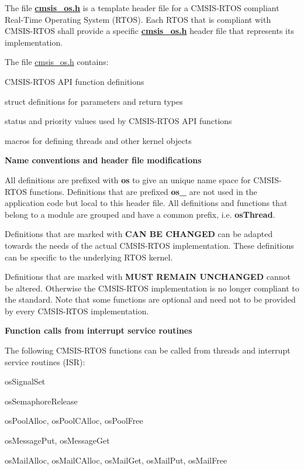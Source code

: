 The file {\bfseries{\mbox{\hyperlink{cmsis__os_8h_source}{cmsis\+\_\+os.\+h}}}} is a template header file for a C\+M\+S\+I\+S-\/\+R\+T\+OS compliant Real-\/\+Time Operating System (R\+T\+OS). Each R\+T\+OS that is compliant with C\+M\+S\+I\+S-\/\+R\+T\+OS shall provide a specific {\bfseries{\mbox{\hyperlink{cmsis__os_8h_source}{cmsis\+\_\+os.\+h}}}} header file that represents its implementation.

The file \mbox{\hyperlink{cmsis__os_8h_source}{cmsis\+\_\+os.\+h}} contains\+:
\begin{DoxyItemize}
\item C\+M\+S\+I\+S-\/\+R\+T\+OS A\+PI function definitions
\item struct definitions for parameters and return types
\item status and priority values used by C\+M\+S\+I\+S-\/\+R\+T\+OS A\+PI functions
\item macros for defining threads and other kernel objects
\end{DoxyItemize}

{\bfseries{Name conventions and header file modifications}}

All definitions are prefixed with {\bfseries{os}} to give an unique name space for C\+M\+S\+I\+S-\/\+R\+T\+OS functions. Definitions that are prefixed {\bfseries{os\+\_\+}} are not used in the application code but local to this header file. All definitions and functions that belong to a module are grouped and have a common prefix, i.\+e. {\bfseries{os\+Thread}}.

Definitions that are marked with {\bfseries{C\+AN BE C\+H\+A\+N\+G\+ED}} can be adapted towards the needs of the actual C\+M\+S\+I\+S-\/\+R\+T\+OS implementation. These definitions can be specific to the underlying R\+T\+OS kernel.

Definitions that are marked with {\bfseries{M\+U\+ST R\+E\+M\+A\+IN U\+N\+C\+H\+A\+N\+G\+ED}} cannot be altered. Otherwise the C\+M\+S\+I\+S-\/\+R\+T\+OS implementation is no longer compliant to the standard. Note that some functions are optional and need not to be provided by every C\+M\+S\+I\+S-\/\+R\+T\+OS implementation.

{\bfseries{Function calls from interrupt service routines}}

The following C\+M\+S\+I\+S-\/\+R\+T\+OS functions can be called from threads and interrupt service routines (I\+SR)\+:
\begin{DoxyItemize}
\item os\+Signal\+Set
\item os\+Semaphore\+Release
\item os\+Pool\+Alloc, os\+Pool\+C\+Alloc, os\+Pool\+Free
\item os\+Message\+Put, os\+Message\+Get
\item os\+Mail\+Alloc, os\+Mail\+C\+Alloc, os\+Mail\+Get, os\+Mail\+Put, os\+Mail\+Free
\end{DoxyItemize}

